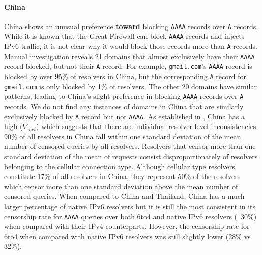 \paragraph{China}
China shows an unusual preference \textbf{toward} blocking \texttt{AAAA}
records over \texttt{A} records. While it is known that the Great Firewall
can block \texttt{AAAA} records and injects IPv6 traffic, it is not clear why it
would block those records more than \texttt{A} records. Manual investigation reveals
21 domains that almost exclusively have their \texttt{AAAA} record blocked, but
not their \texttt{A} record. For example, \texttt{gmail.com}'s \texttt{AAAA}
record is blocked by over 95\% of resolvers in China, but the corresponding
\texttt{A} record for \texttt{gmail.com} is only blocked by 1\% of resolvers.
The other 20 domains have similar patterns, leading to China's slight preference
in blocking \texttt{AAAA} records over \texttt{A} records. We do not find any
instances of domains in China that are similarly exclusively blocked by
\texttt{A} record but not \texttt{AAAA}. As established in 
,
China has a high ($\nabla_{net}$) which suggests that there are individual resolver
level inconsistencies. 90\% of all resolvers in China fall within one standard deviation
of the mean number of censored queries by all resolvers. Resolvers that censor
more than one standard deviation of the mean of requests consist disproportionately
of resolvers belonging to the cellular connection type. Although cellular type resolvers
constitute 17\% of all resolvers in China, they represent 50\% of the resolvers which
censor more than one standard deviation above the mean number of censored queries. 
When compared to China and Thailand, China has a much larger percentage of native
IPv6 resolvers but it is still the most consistent in its censorship rate for \texttt{AAAA}
queries over both 6to4 and native IPv6 resolvers (~30\%) when compared with their IPv4
counterparts. However, the censorship rate for 6to4 when compared with native IPv6 resolvers
was still slightly lower (28\% vs 32\%).





